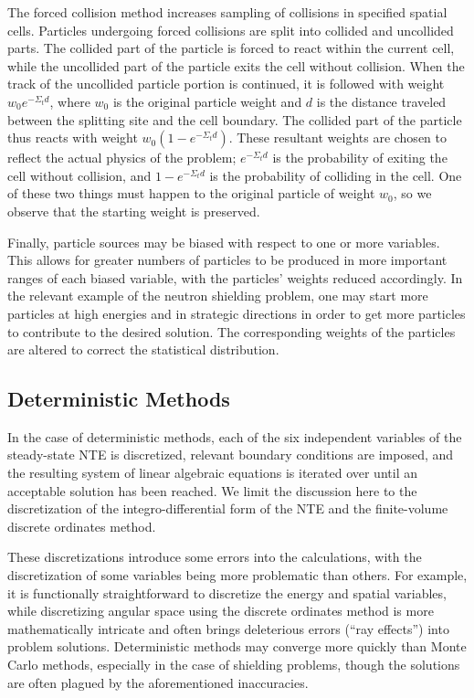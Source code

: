 The forced collision method increases sampling of collisions in specified spatial 
cells. Particles undergoing forced collisions are split into collided and uncollided
parts. The collided part of the particle is forced to react within the current cell,
while the uncollided part of the particle exits the cell without collision. When the
track of the uncollided particle portion is continued, it is followed with weight
$w_0e^{-\Sigma_t d}$, where $w_0$ is the original particle weight and $d$ is the
distance traveled between the splitting site and the cell boundary. The collided part
of the particle thus reacts with weight $w_0\left(1 - e^{-\Sigma_t d}\right)$. These
resultant weights are chosen to reflect the actual physics of the problem; 
$e^{-\Sigma_t d}$ is the probability of exiting the cell without collision, and 
$1 - e^{-\Sigma_t d}$ is the probability of colliding in the cell. One of these two
things must happen to the original particle of weight $w_0$, so we observe that the starting
weight is preserved.

Finally, particle sources may be biased with respect to one or more variables. This
allows for greater numbers of particles to be produced in more important ranges of 
each biased variable, with the particles' weights reduced accordingly. In the relevant
example of the neutron shielding problem, one may start more particles
at high energies and in strategic directions in order to get more particles to 
contribute to the desired solution. The corresponding weights of the particles are 
altered to correct the statistical distribution.

\subsection{Deterministic Methods}

In the case of deterministic methods, each of the six independent variables of the 
steady-state NTE is discretized, relevant boundary conditions are imposed, and the 
resulting system of linear algebraic equations is iterated over until an acceptable
solution has been reached. We limit the discussion here to the discretization of the
integro-differential form of the NTE and the finite-volume discrete ordinates method.

These discretizations introduce some errors into the calculations, with the
discretization of some variables being more problematic than others. For example, it
is functionally straightforward to discretize the energy and spatial variables, 
while discretizing angular space using the discrete ordinates method is more mathematically
intricate and often brings deleterious errors (``ray effects'') into problem solutions.
Deterministic methods may converge more quickly than Monte Carlo methods, especially
in the case of shielding problems, though the solutions are often plagued by the
aforementioned inaccuracies.

